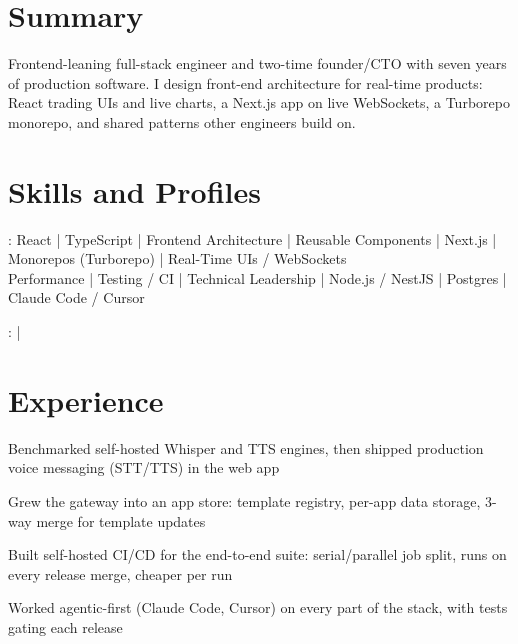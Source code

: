 \documentclass[print]{jack-resume}
\begin{document}
\pagecolor{darkmodeBackground}


\begin{minipage}[t][1cm][t]{.03\textwidth}
    \hfill
\end{minipage}

\section{Summary}
Frontend-leaning full-stack engineer and two-time founder/CTO with seven years of production software. I design front-end architecture for real-time products: React trading UIs and live charts, a Next.js app on live WebSockets, a Turborepo monorepo, and shared patterns other engineers build on.
\sectionsep

\section{Skills and Profiles}
:
React \hfill | \hfill
TypeScript \hfill | \hfill
Frontend Architecture \hfill | \hfill
Reusable Components \hfill | \hfill
Next.js \hfill | \hfill
Monorepos (Turborepo) \hfill | \hfill
Real-Time UIs / WebSockets \\
\hspace{1.0cm} Performance \hfill | \hfill
Testing / CI \hfill | \hfill
Technical Leadership \hfill | \hfill
Node.js / NestJS \hfill | \hfill
Postgres \hfill | \hfill
Claude Code / Cursor \\

\raggedright{
    :
      \href{https://www.linkedin.com/in/jack-sturtevant/}{ \ExternalLink} |
     \href{https://github.com/jacksturt}{ \ExternalLink}}

\section{Experience}

\begin{tightemize}
    \item Benchmarked self-hosted Whisper and TTS engines, then shipped production voice messaging (STT/TTS) in the web app
    \item Grew the gateway into an app store: template registry, per-app data storage, 3-way merge for template updates
    \item Built self-hosted CI/CD for the end-to-end suite: serial/parallel job split, runs on every release merge, cheaper per run
    \item Worked agentic-first (Claude Code, Cursor) on every part of the stack, with tests gating each release
\end{tightemize}
\sectionsep
\end{document}
